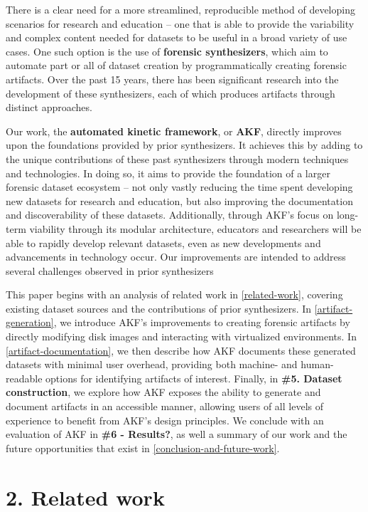 There is a clear need for a more streamlined, reproducible method of
developing scenarios for research and education -- one that is able to
provide the variability and complex content needed for datasets to be
useful in a broad variety of use cases. One such option is the use of
\textbf{forensic synthesizers}, which aim to automate part or all of
dataset creation by programmatically creating forensic artifacts. Over
the past 15 years, there has been significant research into the
development of these synthesizers, each of which produces artifacts
through distinct approaches.

Our work, the \textbf{automated kinetic framework}, or \textbf{AKF},
directly improves upon the foundations provided by prior synthesizers.
It achieves this by adding to the unique contributions of these past
synthesizers through modern techniques and technologies. In doing so, it
aims to provide the foundation of a larger forensic dataset ecosystem --
not only vastly reducing the time spent developing new datasets for
research and education, but also improving the documentation and
discoverability of these datasets. Additionally, through AKF's focus on
long-term viability through its modular architecture, educators and
researchers will be able to rapidly develop relevant datasets, even as
new developments and advancements in technology occur. Our improvements
are intended to address several challenges observed in prior
synthesizers

This paper begins with an analysis of related work in \autoref{related-work}, covering existing dataset sources and the contributions
of prior synthesizers. In \autoref{artifact-generation}, we
introduce AKF's improvements to creating forensic artifacts by directly
modifying disk images and interacting with virtualized environments. In
\autoref{artifact-documentation}, we then describe how AKF documents
these generated datasets with minimal user overhead, providing both
machine- and human-readable options for identifying artifacts of
interest. Finally, in \textbf{\#5. Dataset construction}, we explore how
AKF exposes the ability to generate and document artifacts in an
accessible manner, allowing users of all levels of experience to benefit
from AKF's design principles. We conclude with an evaluation of AKF in
\textbf{\#6 - Results?}, as well a summary of our work and the future
opportunities that exist in \autoref{conclusion-and-future-work}.

\section{2. Related work}\label{related-work}

